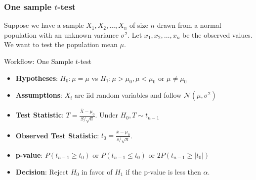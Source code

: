 \documentclass[a4paper]{article}\usepackage[]{graphicx}\usepackage[]{xcolor}
\begin{document}
\subsubsection{One sample \( t \)-test}
Suppose we have a sample \( X_1,X_2,\dotsc,X_n \) of size \( n \) drawn from a normal population with an unknown variance \( \sigma^2 \). Let \( x_1,x_2,\dotsc,x_n \) be the \textcolor{myred}{observed values}. We want to test the population mean \( \mu \).  
\begin{redbox}{Workflow: One Sample \( t \)-test}
	\begin{itemize}
		\item \textbf{Hypotheses}: \( H_0: \mu = \mu \) vs \( H_1: \mu > \mu_0, \mu < \mu_0 \) or \( \mu \neq \mu_0 \)
		\item \textbf{Assumptions}: \( X_i \) are iid random variables and follow \( \mathcal{N} (\mu,\sigma^2) \) 
		\item \textbf{Test Statistic}: \( T = \frac{\overline{X} - \mu_0}{S / \sqrt{n}} \). Under \( H_0, T \sim t_{n-1} \)   
		\item \textbf{Observed Test Statistic}: \( t_0 = \frac{\overline{x} - \mu_0}{s / \sqrt{n}} \).
		\item \textbf{p-value}: \( P(t_{n-1} \geq t_0) \) or \( P(t_{n-1} \leq t_0) \) or \( 2P(t_{n-1} \geq \lvert t_0 \rvert) \)
		\item \textbf{Decision}: Reject \( H_0 \) in favor of \( H_1 \) if the p-value is less then \( \alpha \).
	\end{itemize}
\end{redbox}
\end{document}
